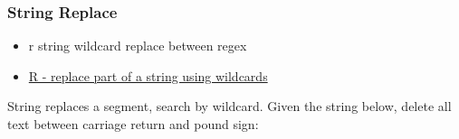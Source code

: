 \documentclass[
]{book}
\newenvironment{Shaded}{\begin{snugshade}}{\end{snugshade}}
\newcommand{\CharTok}[1]{\textcolor[rgb]{0.31,0.60,0.02}{#1}}
\newcommand{\CommentTok}[1]{\textcolor[rgb]{0.56,0.35,0.01}{\textit{#1}}}
\newcommand{\DataTypeTok}[1]{\textcolor[rgb]{0.13,0.29,0.53}{#1}}
\newcommand{\KeywordTok}[1]{\textcolor[rgb]{0.13,0.29,0.53}{\textbf{#1}}}
\newcommand{\NormalTok}[1]{#1}
\newcommand{\OperatorTok}[1]{\textcolor[rgb]{0.81,0.36,0.00}{\textbf{#1}}}
\newcommand{\StringTok}[1]{\textcolor[rgb]{0.31,0.60,0.02}{#1}}
\providecommand{\tightlist}{%
  \setlength{\itemsep}{0pt}\setlength{\parskip}{0pt}}
\begin{document}
\hypertarget{string-replace}{%
\subsubsection{String Replace}\label{string-replace}}

\begin{itemize}
\tightlist
\item
  r string wildcard replace between regex
\item
  \href{https://stackoverflow.com/a/27246520/8280804}{R - replace part of a string using wildcards}
\end{itemize}

\begin{Shaded}
\end{Shaded}

String replaces a segment, search by wildcard. Given the string below, delete all text between carriage return and pound sign:
\end{document}
